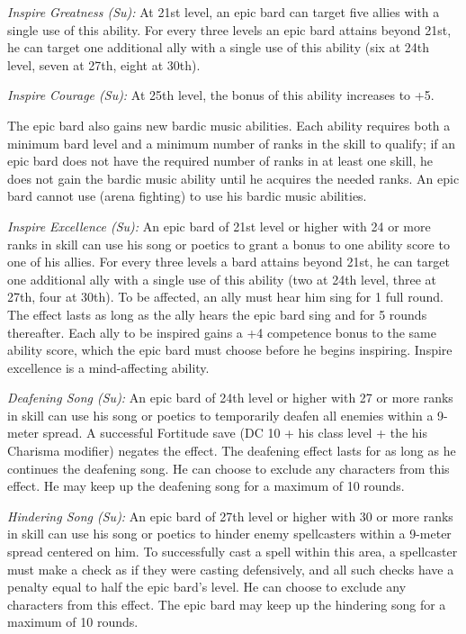 \textit{Inspire Greatness (Su):} At 21st level, an epic bard can target five allies with a single use of this ability. For every three levels an epic bard attains beyond 21st, he can target one additional ally with a single use of this ability (six at 24th level, seven at 27th, eight at 30th).

\textit{Inspire Courage (Su):} At 25th level, the bonus of this ability increases to +5.

The epic bard also gains new bardic music abilities. Each ability requires both a minimum bard level and a minimum number of ranks in the  skill to qualify; if an epic bard does not have the required number of ranks in at least one  skill, he does not gain the bardic music ability until he acquires the needed ranks. An epic bard cannot use  (arena fighting) to use his bardic music abilities.

\textit{Inspire Excellence (Su):} An epic bard of 21st level or higher with 24 or more ranks in  skill can use his song or poetics to grant a bonus to one ability score to one of his allies. For every three levels a bard attains beyond 21st, he can target one additional ally with a single use of this ability (two at 24th level, three at 27th, four at 30th). To be affected, an ally must hear him sing for 1 full round. The effect lasts as long as the ally hears the epic bard sing and for 5 rounds thereafter. Each ally to be inspired gains a +4 competence bonus to the same ability score, which the epic bard must choose before he begins inspiring. Inspire excellence is a mind-affecting ability.

\textit{Deafening Song (Su):} An epic bard of 24th level or higher with 27 or more ranks in  skill can use his song or poetics to temporarily deafen all enemies within a 9-meter spread. A successful Fortitude save (DC 10 + \onehalf his class level + the his Charisma modifier) negates the effect. The deafening effect lasts for as long as he continues the deafening song. He can choose to exclude any characters from this effect. He may keep up the deafening song for a maximum of 10 rounds.

\textit{Hindering Song (Su):} An epic bard of 27th level or higher with 30 or more ranks in  skill can use his song or poetics to hinder enemy spellcasters within a 9-meter spread centered on him. To successfully cast a spell within this area, a spellcaster must make a  check as if they were casting defensively, and all such checks have a penalty equal to half the epic bard's level. He can choose to exclude any characters from this effect. The epic bard may keep up the hindering song for a maximum of 10 rounds.


